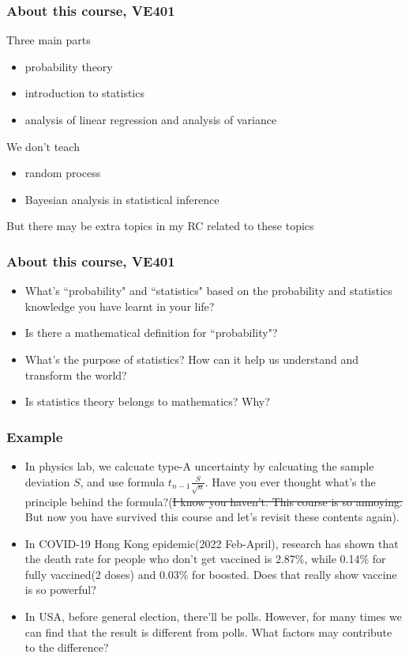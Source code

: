 \documentclass{beamer}
\begin{document}
\begin{frame}
    \frametitle{About this course, VE401}
    Three main parts
    \begin{itemize}
        \item probability theory
        \item introduction to statistics
        \item analysis of linear regression and analysis of variance
    \end{itemize}
    We don't teach
    \begin{itemize}
        \item random process
        \item Bayesian analysis in statistical inference
    \end{itemize}
    But there may be extra topics in my RC related to these topics

\end{frame}

\begin{frame}
    \frametitle{About this course, VE401}
    
    \begin{itemize}
        \item What's ``probability" and ``statistics" based on the probability and statistics knowledge you have learnt in your life?
        \item Is there a mathematical definition for ``probability"?
        \item What's the purpose of statistics? How can it help us understand and transform the world?
        \item Is statistics theory belongs to mathematics? Why?
    \end{itemize}
\end{frame}

\begin{frame}
    \frametitle{Example}
    \begin{itemize}
        \item In physics lab, we calcuate type-A uncertainty by calcuating the sample deviation $S$, and use formula $t_{n-1}\frac{S}{\sqrt{n}}$. Have you ever thought what's the principle behind the formula?(\st{I know you haven't. This course is so annoying.} But now you have survived this course and let's revisit these contents again).
        \item In COVID-19 Hong Kong epidemic(2022 Feb-April), research has shown that the death rate for people who don't get vaccined is 2.87\%, while 0.14\% for fully vaccined(2 doses) and 0.03\% for boosted. Does that really show vaccine is so powerful?
        \item In USA, before general election, there'll be polls. However, for many times we can find that the result is different from polls. What factors may contribute to the difference?
    \end{itemize}
    

\end{frame}
\end{document}
